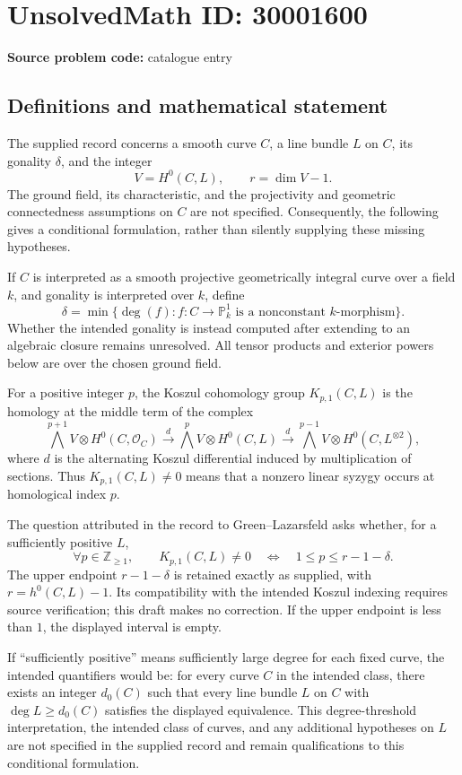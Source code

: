 \documentclass[11pt]{article}
\begin{document}
\section*{UnsolvedMath ID: 30001600}
\textbf{Source problem code:} catalogue entry
\subsection{Definitions and mathematical statement}
The supplied record concerns a smooth curve \(C\), a line bundle \(L\) on \(C\), its gonality \(\delta\), and the integer
\[
V=H^0(C,L),\qquad r=\dim V-1.
\]
The ground field, its characteristic, and the projectivity and geometric connectedness assumptions on \(C\) are not specified. Consequently, the following gives a conditional formulation, rather than silently supplying these missing hypotheses.

If \(C\) is interpreted as a smooth projective geometrically integral curve over a field \(k\), and gonality is interpreted over \(k\), define
\[
\delta=\min\{\deg(f):f\colon C\longrightarrow\mathbb P^1_k\text{ is a nonconstant }k\text{-morphism}\}.
\]
Whether the intended gonality is instead computed after extending to an algebraic closure remains unresolved. All tensor products and exterior powers below are over the chosen ground field.

For a positive integer \(p\), the Koszul cohomology group \(K_{p,1}(C,L)\) is the homology at the middle term of the complex
\[
\bigwedge^{p+1}V\otimes H^0(C,\mathcal O_C)
\xrightarrow{d}
\bigwedge^p V\otimes H^0(C,L)
\xrightarrow{d}
\bigwedge^{p-1}V\otimes H^0(C,L^{\otimes 2}),
\]
where \(d\) is the alternating Koszul differential induced by multiplication of sections. Thus \(K_{p,1}(C,L)\neq 0\) means that a nonzero linear syzygy occurs at homological index \(p\).

The question attributed in the record to Green--Lazarsfeld asks whether, for a sufficiently positive \(L\),
\[
\forall p\in\mathbb Z_{\geq 1},\qquad
K_{p,1}(C,L)\neq 0
\quad\Longleftrightarrow\quad
1\leq p\leq r-1-\delta.
\]
The upper endpoint \(r-1-\delta\) is retained exactly as supplied, with \(r=h^0(C,L)-1\). Its compatibility with the intended Koszul indexing requires source verification; this draft makes no correction. If the upper endpoint is less than \(1\), the displayed interval is empty.

If ``sufficiently positive'' means sufficiently large degree for each fixed curve, the intended quantifiers would be: for every curve \(C\) in the intended class, there exists an integer \(d_0(C)\) such that every line bundle \(L\) on \(C\) with \(\deg L\geq d_0(C)\) satisfies the displayed equivalence. This degree-threshold interpretation, the intended class of curves, and any additional hypotheses on \(L\) are not specified in the supplied record and remain qualifications to this conditional formulation.
\end{document}
